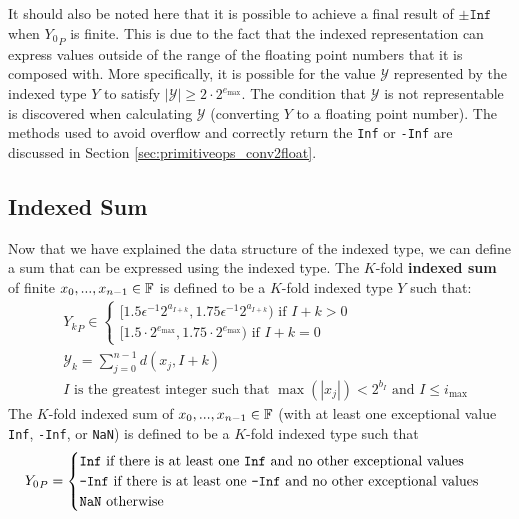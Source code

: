       It should also be noted here that it is possible to achieve a final result of
      $\pm \texttt{Inf}$ when ${Y_0}_P$ is finite. This is due to
      the fact that the indexed representation can express values outside of
      the range of the floating point numbers that it is composed with. More
      specifically, it is possible for the value $\mathcal{Y}$ represented by
      the indexed type $Y$ to satisfy $|\mathcal{Y}| \geq 2 \cdot
      2^{e_{\max}}$. The condition that $\mathcal{Y}$ is not representable is
      discovered when calculating $\mathcal{Y}$ (converting $Y$ to a floating
      point number). The methods used to avoid overflow and correctly return
      the \texttt{Inf} or \texttt{-Inf} are discussed in Section
      \ref{sec:primitiveops_conv2float}.

    \subsection{Indexed Sum}
      \label{sec:indexed_sum}
      Now that we have explained the data structure of the indexed type, we can define a sum that can be expressed using the indexed type. The $K$-fold \textbf{indexed sum} of finite $x_0, ..., x_{n - 1} \in \mathbb{F}$ is defined to be a $K$-fold indexed type $Y$ such that:
      \begin{align}
        &{Y_k}_P \in \begin{cases}[1.5  \epsilon^{-1} 2^{a_{I + k}}, 1.75  \epsilon^{-1} 2^{a_{I + k}}) \text{ if } I + k > 0 \\ [1.5 \cdot 2^{e_{\max}}, 1.75 \cdot 2^{e_{\max}}) \text{ if } I + k = 0\end{cases} \nonumber\\
        &\mathcal{Y}_k = \sum\limits_{j = 0}^{n - 1}d(x_j, I + k)\nonumber\\
        & I\text{ is the greatest integer such that }\max(|x_j|) < 2^{b_I} \text{ and } I \leq i_{\max}\label{eq:indexed_sum}
      \end{align}
      The $K$-fold indexed sum of $x_0, ..., x_{n - 1} \in \mathbb{F}$ (with at least one exceptional value \texttt{Inf}, \texttt{-Inf}, or \texttt{NaN}) is defined to be a $K$-fold indexed type such that
      \begin{equation}
        {Y_0}_P = \begin{cases}\texttt{Inf} \text{ if there is at least one \texttt{Inf} and no other exceptional values}\\ \texttt{-Inf} \text{ if there is at least one \texttt{-Inf} and no other exceptional values}\\ \texttt{NaN}\text{ otherwise}\end{cases} \label{eq:indexed_sum_exceptional}
      \end{equation}
